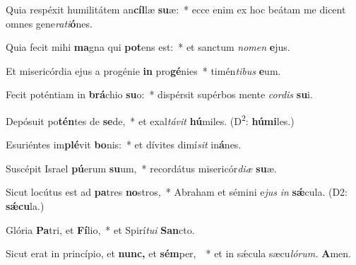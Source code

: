 \item Quia respéxit humilitátem an\textbf{cíl}læ \textbf{su}æ:~* ecce enim ex hoc beátam me dicent omnes gene\textit{rati}\textbf{ó}nes.
\item Quia fecit mihi \textbf{ma}gna qui \textbf{pot}ens est:~* et sanctum \textit{nomen} \textbf{e}jus.
\item Et misericórdia ejus a progénie \textbf{in} pro\textbf{gé}nies~* timén\textit{tibus} \textbf{e}um.
\item Fecit poténtiam in \textbf{brá}chio \textbf{su}o:~* dispérsit supérbos mente \textit{cordis} \textbf{su}i.
\item Depósuit po\textbf{tén}tes de \textbf{se}de,~* et exal\textit{távit} \textbf{hú}miles. (D\textsuperscript{2}: \textbf{húmi}les.)
\item Esuriéntes im\textbf{plé}vit \textbf{bo}nis:~* et dívites dimí\hspace{0.02em}\textit{sit} in\textbf{á}nes.
\item Suscépit Israel \textbf{pú}erum \textbf{su}um,~* recordátus misericór\textit{diæ} \textbf{su}æ.
\item Sicut locútus est ad \textbf{pa}tres \textbf{no}stros,~* Abraham et sémini e\hspace{0.02em}\textit{jus} \textit{in} \textbf{sǽ}cula. (D2: \textbf{sǽcu}la.)
\item Glória \textbf{Pa}tri, et \textbf{Fí}lio,~* et Spirí\hspace{0.03em}\textit{tui} \textbf{San}cto.
\item Sicut erat in princípio, et \textbf{nunc,} et \textbf{sém}per, ~* et in sǽcula sæcu\hspace{0.03em}\textit{lórum.} \textbf{A}men.